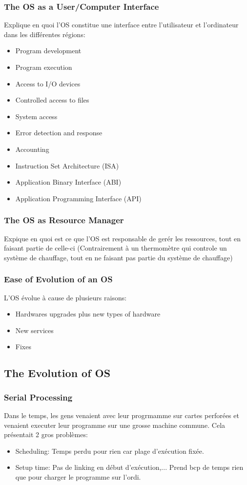 \subsubsection{The OS as a User/Computer Interface}

Explique en quoi l’OS constitue une interface entre l’utilisateur et l’ordinateur dans les différentes régions:
\begin{itemize}
\item Program development
\item Program execution
\item Access to I/O devices
\item Controlled access to files
\item System access
\item Error detection and response
\item Accounting
\item Instruction Set Architecture (ISA)
\item Application Binary Interface (ABI)
\item Application Programming Interface (API)
\end{itemize}

\subsubsection{The OS as Resource Manager}
Expique en quoi est ce que l’OS est responsable de gerér les ressources, tout en faisant partie de celle-ci (Contrairement à un thermomètre qui controle un système de chauffage, tout en ne faisant pas partie du système de chauffage)

\subsubsection{Ease of Evolution of an OS}
L'OS évolue à cause de plusieurs raisons:
\begin{itemize}
\item Hardwares upgrades plus new types of hardware
\item New services
\item Fixes
\end{itemize}

\subsection{The Evolution of OS}

\subsubsection{Serial Processing}
Dans le temps, les gens venaient avec leur progrmamme sur cartes perforées et venaient executer leur programme sur une grosse machine commune. Cela présentait 2 gros problèmes:
\begin{itemize}
\item Scheduling: Temps perdu pour rien car plage d’exécution fixée.
\item Setup time: Pas de linking en début d’exécution,... Prend bcp de temps rien que
pour charger le programme sur l’ordi.
\end{itemize}

